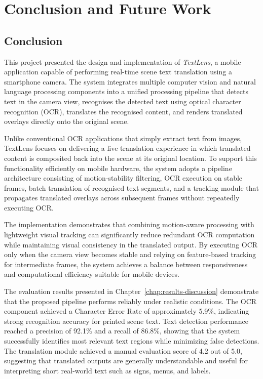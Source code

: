\chapter{Conclusion and Future Work}
\label{chap:conclusion}

\section{Conclusion}

This project presented the design and implementation of \textit{TextLens}, a mobile application capable of performing real-time scene text translation using a smartphone camera. The system integrates multiple computer vision and natural language processing components into a unified processing pipeline that detects text in the camera view, recognises the detected text using optical character recognition (OCR), translates the recognised content, and renders translated overlays directly onto the original scene.

Unlike conventional OCR applications that simply extract text from images, TextLens focuses on delivering a live translation experience in which translated content is composited back into the scene at its original location. To support this functionality efficiently on mobile hardware, the system adopts a pipeline architecture consisting of motion-stability filtering, OCR execution on stable frames, batch translation of recognised text segments, and a tracking module that propagates translated overlays across subsequent frames without repeatedly executing OCR.

The implementation demonstrates that combining motion-aware processing with lightweight visual tracking can significantly reduce redundant OCR computation while maintaining visual consistency in the translated output. By executing OCR only when the camera view becomes stable and relying on feature-based tracking for intermediate frames, the system achieves a balance between responsiveness and computational efficiency suitable for mobile devices.

The evaluation results presented in Chapter~\ref{chap:results-discussion} demonstrate that the proposed pipeline performs reliably under realistic conditions. The OCR component achieved a Character Error Rate of approximately 5.9\%, indicating strong recognition accuracy for printed scene text. Text detection performance reached a precision of 92.1\% and a recall of 86.8\%, showing that the system successfully identifies most relevant text regions while minimizing false detections. The translation module achieved a manual evaluation score of 4.2 out of 5.0, suggesting that translated outputs are generally understandable and useful for interpreting short real-world text such as signs, menus, and labels.

